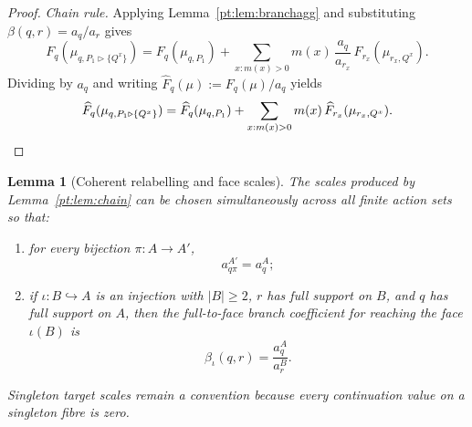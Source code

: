 \documentclass[11pt,a4paper]{article}
\newtheorem{lemma}[theorem]{Lemma}
\theoremstyle{definition}
\newcommand{\1}{\mathbf 1}
\begin{document}
\begin{proof}
\emph{Chain rule.}  Applying Lemma~\ref{pt:lem:branchagg} and substituting $\beta(q,r)=a_q/a_r$ gives
\[
F_q(\mu_{q,P_1\triangleright\{Q^x\}})
=
F_q(\mu_{q,P_1})+\sum_{x:m(x)>0}m(x)\,\frac{a_q}{a_{r_x}}\,F_{r_x}(\mu_{r_x,Q^x}).
\]
Dividing by $a_q$ and writing $\widehat F_q(\mu):=F_q(\mu)/a_q$ yields
\[
\widehat F_q(\mu_{q,P_1\triangleright\{Q^x\}})
=
\widehat F_q(\mu_{q,P_1})+\sum_{x:m(x)>0}m(x)\,\widehat F_{r_x}(\mu_{r_x,Q^x}).
\qedhere
\]
\end{proof}

\begin{lemma}[Coherent relabelling and face scales]\label{pt:lem:facescales}
The scales produced by Lemma~\ref{pt:lem:chain} can be chosen simultaneously across all finite action sets so that:
\begin{enumerate}
\item for every bijection $\pi:A\to A'$,
\[
a^{A'}_{q\pi}=a^A_q;
\]
\item if $\iota:B\hookrightarrow A$ is an injection with $|B|\ge2$, $r$ has full support on $B$, and $q$ has full support
on $A$, then the full-to-face branch coefficient for reaching the face $\iota(B)$ is
\begin{equation}
\beta_\iota(q,r)=\frac{a^A_q}{a^B_r}.
\tag{FS}\label{pt:eq:facescale}
\end{equation}
\end{enumerate}
Singleton target scales remain a convention because every continuation value on a singleton fibre is zero.
\end{lemma}
\end{document}
